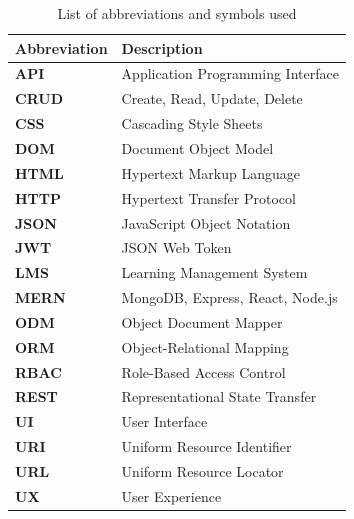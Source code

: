 \documentclass[12pt,a4paper]{report}
\begin{document}
\begin{table}[h!]
    \centering
    \begin{tabular}{|p{3cm}|p{10cm}|}
        \hline
        \textbf{Abbreviation} & \textbf{Description} \\
        \hline
        \textbf{API} & Application Programming Interface \\
        \hline
        \textbf{CRUD} & Create, Read, Update, Delete \\
        \hline
        \textbf{CSS} & Cascading Style Sheets \\
        \hline
        \textbf{DOM} & Document Object Model \\
        \hline
        \textbf{HTML} & Hypertext Markup Language \\
        \hline
        \textbf{HTTP} & Hypertext Transfer Protocol \\
        \hline
        \textbf{JSON} & JavaScript Object Notation \\
        \hline
        \textbf{JWT} & JSON Web Token \\
        \hline
        \textbf{LMS} & Learning Management System \\
        \hline
        \textbf{MERN} & MongoDB, Express, React, Node.js \\
        \hline
        \textbf{ODM} & Object Document Mapper \\
        \hline
        \textbf{ORM} & Object-Relational Mapping \\
        \hline
        \textbf{RBAC} & Role-Based Access Control \\
        \hline
        \textbf{REST} & Representational State Transfer \\
        \hline
        \textbf{UI} & User Interface \\
        \hline
        \textbf{URI} & Uniform Resource Identifier \\
        \hline
        \textbf{URL} & Uniform Resource Locator \\
        \hline
        \textbf{UX} & User Experience \\
        \hline
    \end{tabular}
    \caption{List of abbreviations and symbols used}
    \label{tab:abbreviations}
\end{table}

\clearpage

\pagestyle{main}

\titleformat{\chapter}[display]
  {\normalfont\fontsize{14}{16.8}\bfseries}{\chaptertitlename\ \thechapter}{10pt}{\fontsize{14}{16.8}\selectfont\bfseries}
\end{document}
